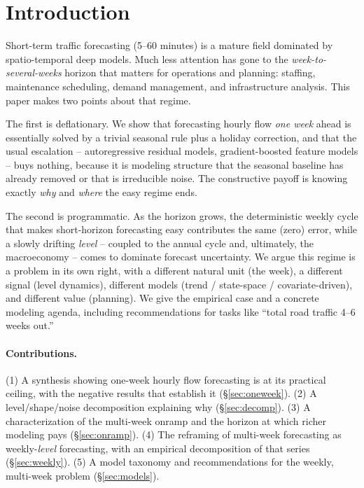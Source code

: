 \documentclass[11pt]{article}
\begin{document}
\section{Introduction}
Short-term traffic forecasting (5--60 minutes) is a mature field dominated by
spatio-temporal deep models. Much less attention has gone to the
\emph{week-to-several-weeks} horizon that matters for operations and planning:
staffing, maintenance scheduling, demand management, and infrastructure analysis.
This paper makes two points about that regime.

The first is deflationary. We show that forecasting hourly flow \emph{one week}
ahead is essentially solved by a trivial seasonal rule plus a holiday correction,
and that the usual escalation -- autoregressive residual models, gradient-boosted
feature models -- buys nothing, because it is modeling structure that the seasonal
baseline has already removed or that is irreducible noise. The constructive payoff
is knowing exactly \emph{why} and \emph{where} the easy regime ends.

The second is programmatic. As the horizon grows, the deterministic weekly cycle
that makes short-horizon forecasting easy contributes the same (zero) error, while
a slowly drifting \emph{level} -- coupled to the annual cycle and, ultimately, the
macroeconomy -- comes to dominate forecast uncertainty. We argue this regime is a
problem in its own right, with a different natural unit (the week), a different
signal (level dynamics), different models (trend / state-space / covariate-driven),
and different value (planning). We give the empirical case and a concrete modeling
agenda, including recommendations for tasks like ``total road traffic 4--6 weeks
out.''

\paragraph{Contributions.}
(1) A synthesis showing one-week hourly flow forecasting is at its practical
ceiling, with the negative results that establish it
(\S\ref{sec:oneweek}). (2) A level/shape/noise decomposition explaining why
(\S\ref{sec:decomp}). (3) A characterization of the multi-week onramp and the
horizon at which richer modeling pays (\S\ref{sec:onramp}). (4) The reframing of
multi-week forecasting as weekly-\emph{level} forecasting, with an empirical
decomposition of that series (\S\ref{sec:weekly}). (5) A model taxonomy and
recommendations for the weekly, multi-week problem (\S\ref{sec:models}).
\end{document}
